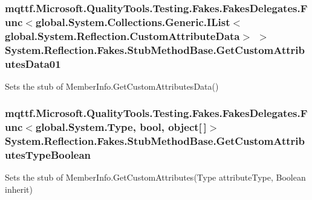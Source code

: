 \hypertarget{class_system_1_1_reflection_1_1_fakes_1_1_stub_method_base_aff8bd4745418b80e02dd1cfd69134d39}{
\subsubsection[{Get\-Custom\-Attributes\-Data01}]{\setlength{\rightskip}{0pt plus 5cm}mqttf.\-Microsoft.\-Quality\-Tools.\-Testing.\-Fakes.\-Fakes\-Delegates.\-Func$<$global.\-System.\-Collections.\-Generic.\-I\-List$<$global.\-System.\-Reflection.\-Custom\-Attribute\-Data$>$ $>$ System.\-Reflection.\-Fakes.\-Stub\-Method\-Base.\-Get\-Custom\-Attributes\-Data01}}\label{class_system_1_1_reflection_1_1_fakes_1_1_stub_method_base_aff8bd4745418b80e02dd1cfd69134d39}


Sets the stub of Member\-Info.\-Get\-Custom\-Attributes\-Data()

\hypertarget{class_system_1_1_reflection_1_1_fakes_1_1_stub_method_base_a466e1057cb0460e6d1f2fa48937439fb}{
\subsubsection[{Get\-Custom\-Attributes\-Type\-Boolean}]{\setlength{\rightskip}{0pt plus 5cm}mqttf.\-Microsoft.\-Quality\-Tools.\-Testing.\-Fakes.\-Fakes\-Delegates.\-Func$<$global.\-System.\-Type, bool, object\mbox{[}$\,$\mbox{]}$>$ System.\-Reflection.\-Fakes.\-Stub\-Method\-Base.\-Get\-Custom\-Attributes\-Type\-Boolean}}\label{class_system_1_1_reflection_1_1_fakes_1_1_stub_method_base_a466e1057cb0460e6d1f2fa48937439fb}


Sets the stub of Member\-Info.\-Get\-Custom\-Attributes(\-Type attribute\-Type, Boolean inherit)

